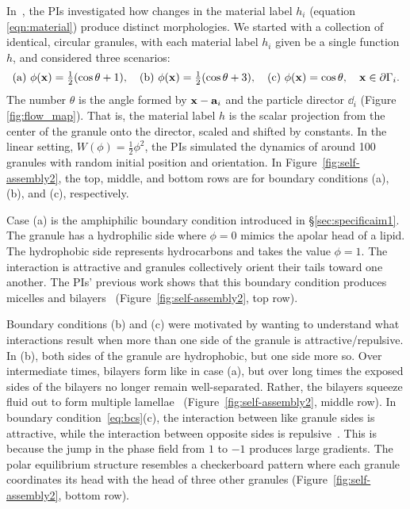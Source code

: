In~\cite{fu-ryh-qua-you2022},  the PIs investigated how changes
in the material label $h_i$ (equation \eqref{eqn:material})
produce distinct morphologies.  We started with a collection 
of identical, circular granules, with each material label $h_i$ given be a 
single function $h$, and considered three scenarios:
\begin{equation}
  \label{eq:bcs}
   \text{(a) }  \phi(\mathbf{x}) = \tfrac{1}{2}(\cos \theta + 1),\quad
   \text{(b)  } \phi(\mathbf{x}) = \tfrac{1}{2}(\cos \theta + 3),\quad
   \text{(c) }  \phi(\mathbf{x}) = \cos \theta, \quad \mathbf{x} \in \partial \Gamma_i.
\end{equation}
The number $\theta$ is the angle formed by $\mathbf{x}-\mathbf{a}_i$
and the particle director $\dd_i$ (Figure
\ref{fig:flow_map}). 
That is, the material label $h$ is the scalar projection from the 
center of the granule onto the director, scaled and shifted by constants. 
In the linear setting, $W(\phi) = \tfrac{1}{2}\phi^2$, the PIs
simulated the dynamics of around 100 granules with random initial position and
orientation.  In Figure~\ref{fig:self-assembly2}, the top, middle, and bottom 
rows are for boundary conditions (a), (b), and (c), respectively. 

Case (a) is the amphiphilic boundary condition introduced in 
\S \ref{sec:specificaim1}.  The granule has a hydrophilic side where 
$\phi =0$ mimics the apolar head of a lipid.
The hydrophobic side represents hydrocarbons and takes the value $\phi  = 1$. 
The interaction is attractive and granules
collectively orient their tails toward one another.  The PIs' previous
work shows that this boundary condition produces micelles and
bilayers~\cite{Fu2018_SIAM} (Figure~\ref{fig:self-assembly2}, top row).

Boundary conditions (b) and (c) were motivated by wanting to understand
what interactions result when more than one side of the granule is attractive/repulsive. 
In (b), both sides of the granule are hydrophobic, but one side more so.
Over intermediate times, bilayers form like in case (a), but over long times
the exposed sides of the bilayers no longer remain well-separated. 
Rather, the bilayers squeeze fluid out to form multiple lamellae~\cite{Huetal19, deMeetal21} 
(Figure~\ref{fig:self-assembly2}, middle row).
In boundary condition~\eqref{eq:bcs}(c), the interaction between like 
granule sides is attractive, while the interaction between opposite sides is 
repulsive~\cite{MaRa76, Ma77}. This is because  the jump in the phase field 
from $1$ to $-1$ produces large gradients.
The polar equilibrium structure resembles a
checkerboard pattern where each granule coordinates its head with the
head of three other granules (Figure~\ref{fig:self-assembly2}, bottom row).

